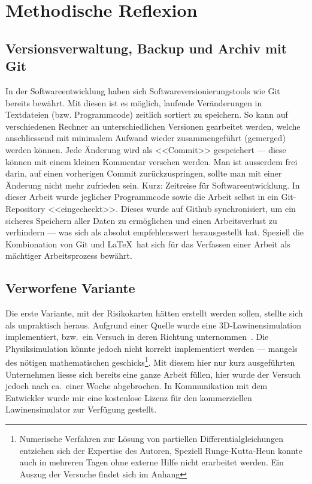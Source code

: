 
\clearpage
\section{Methodische Reflexion}
\subsection{Versionsverwaltung, Backup und Archiv mit Git}

In der Softwareentwicklung haben sich Softwareversionierungstools wie Git bereits bewährt. Mit diesen ist es möglich, laufende Veränderungen in Textdateien (bzw. Programmcode) zeitlich sortiert zu speichern. So kann auf verschiedenen Rechner an unterschiedlichen Versionen gearbeitet werden, welche anschliessend mit minimalem Aufwand wieder zusammengeführt (gemerged) werden können. Jede Änderung wird als <<Commit>> gespeichert --- diese können mit einem kleinen Kommentar versehen werden. Man ist ausserdem frei darin, auf einen vorherigen Commit zurückzuspringen, sollte man mit einer Änderung nicht mehr zufrieden sein. Kurz: Zeitreise für Softwareentwicklung. 
In dieser Arbeit wurde jeglicher Programmcode sowie die Arbeit selbst in ein Git-Repository <<eingecheckt>>. Dieses wurde auf Github synchronisiert, um ein sicheres Speichern aller Daten zu ermöglichen und einen Arbeitsverlust zu verhindern --- was sich als absolut empfehlenswert herausgestellt hat. Speziell die Kombionation von Git und \LaTeX\ hat sich für das Verfassen einer Arbeit als mächtiger Arbeitsprozess bewährt.

\subsection{Verworfene Variante}

Die erste Variante, mit der Risikokarten hätten erstellt werden sollen, stellte sich als unpraktisch heraus. Aufgrund einer Quelle wurde eine 3D-Lawinensimulation implementiert, bzw.\ ein Versuch in deren Richtung unternommen\ \cite{athmaps}. Die Physiksimulation könnte jedoch nicht korrekt implementiert werden --- mangels des nötigen mathematischen geschicks\footnote{Numerische Verfahren zur Lösung von partiellen Differentialgleichungen entziehen sich der Expertise des Autoren, Speziell Runge-Kutta-Heun konnte auch in mehreren Tagen ohne externe Hilfe nicht erarbeitet werden. Ein Auszug der Versuche findet sich im Anhang}. Mit diesem hier nur kurz ausgeführten Unternehmen liesse sich bereits eine ganze Arbeit füllen, hier wurde der Versuch jedoch nach ca.\ einer Woche abgebrochen. In Kommunikation mit dem Entwickler wurde mir eine kostenlose Lizenz für den kommerziellen Lawinensimulator  zur Verfügung gestellt.

